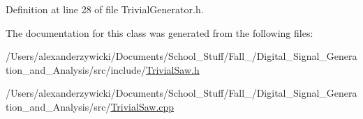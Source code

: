 Definition at line 28 of file Trivial\+Generator.\+h.



The documentation for this class was generated from the following files\+:\begin{DoxyCompactItemize}
\item 
/\+Users/alexanderzywicki/\+Documents/\+School\+\_\+\+Stuff/\+Fall\+\_/\+Digital\+\_\+\+Signal\+\_\+\+Generation\+\_\+and\+\_\+\+Analysis/src/include/\hyperlink{TrivialSaw_8h}{Trivial\+Saw.\+h}\item 
/\+Users/alexanderzywicki/\+Documents/\+School\+\_\+\+Stuff/\+Fall\+\_/\+Digital\+\_\+\+Signal\+\_\+\+Generation\+\_\+and\+\_\+\+Analysis/src/\hyperlink{TrivialSaw_8cpp}{Trivial\+Saw.\+cpp}\end{DoxyCompactItemize}
